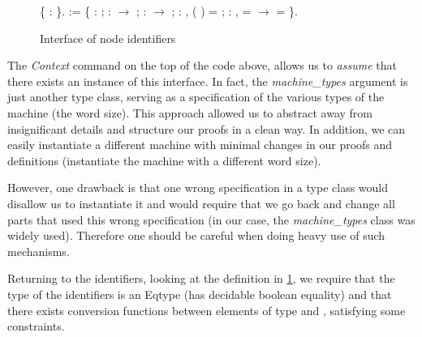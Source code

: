 \begin{figure}[!htpb] 
\begin{coqdoccode}
\coqdocnoindent
{} \{ : \}.\coqdoceol
\coqdocemptyline
\coqdocnoindent
{}  := \{\coqdoceol
\coqdocindent{1.00em}
         : ;\coqdoceol
\coqdocnoindent
\coqdoceol
\coqdocindent{1.00em}
 :   \ensuremath{\rightarrow}  ;\coqdoceol
\coqdocindent{1.00em}
 :  \ensuremath{\rightarrow}  ;\coqdoceol
\coqdocindent{1.00em}
\coqdoceol
\coqdocindent{1.00em}
 : \coqdockw{\ensuremath{\forall}} ,  ( ) =  ;\coqdoceol
\coqdocindent{1.00em}
 : \coqdockw{\ensuremath{\forall}}  ,   =   \ensuremath{\rightarrow}   = \coqdoceol
\coqdocindent{14.50em}
\coqdoceol
\coqdocnoindent
\}.\coqdoceol
\end{coqdoccode}
\caption{Interface of node identifiers}
\label{fig:id_class}
\end{figure}

The \emph{Context} command on the top of the code above, allows us to
\textit{assume} that there exists an instance of this interface.
In fact, the \emph{machine\_types} argument is just another type class,
serving as a specification of the various types of the machine (\EG the word 
size). This approach allowed us to abstract away from insignificant details and
structure our proofs in a clean way.
In addition, we can easily instantiate a different machine with minimal changes
in our proofs and definitions (\EG instantiate the machine with a different word
size).

However, one drawback is that one wrong specification in a type class would
disallow us to instantiate it and would require that we go back and change
all parts that used this wrong specification (\EG in our case, the 
\emph{machine\_types} class was widely used). Therefore one should be careful
when doing heavy use of such mechanisms.

Returning to the identifiers, looking at the definition in \ref{fig:id_class},
we require that the type of the identifiers \id is an Eqtype (has decidable
boolean equality) and that there exists conversion functions between elements
of type \word and \id, satisfying some constraints. 

